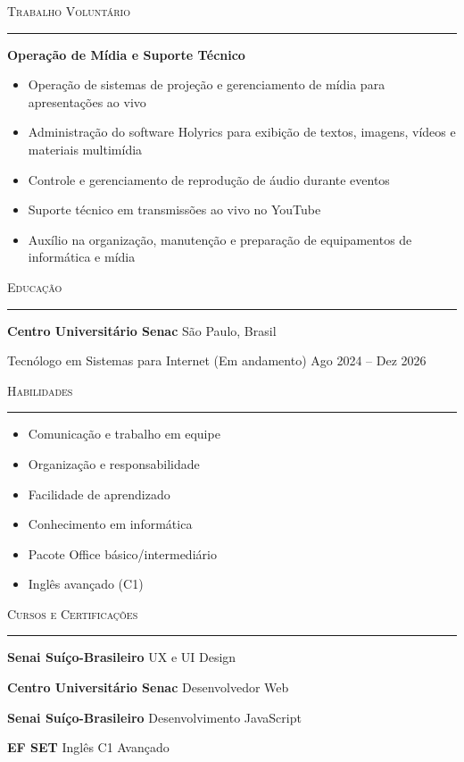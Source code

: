 \documentclass[a4paper]{article}
\newcommand{\header}[1]{
    \vspace{4mm}
    {\large\textsc{#1}}
    
    \vspace{1mm}
    \hrule
    
    \vspace{2mm}
}
\begin{document}

\header{Trabalho Voluntário}

\textbf{Operação de Mídia e Suporte Técnico}

\begin{itemize}[leftmargin=*, itemsep=1pt]
    \item Operação de sistemas de projeção e gerenciamento de mídia para apresentações ao vivo
    \item Administração do software Holyrics para exibição de textos, imagens, vídeos e materiais multimídia
    \item Controle e gerenciamento de reprodução de áudio durante eventos
    \item Suporte técnico em transmissões ao vivo no YouTube
    \item Auxílio na organização, manutenção e preparação de equipamentos de informática e mídia
\end{itemize}


\header{Educação}

\textbf{Centro Universitário Senac}
\hfill São Paulo, Brasil

Tecnólogo em Sistemas para Internet (Em andamento)
\hfill Ago 2024 -- Dez 2026


\header{Habilidades}

\begin{itemize}[leftmargin=*, itemsep=1pt]
    \item Comunicação e trabalho em equipe
    \item Organização e responsabilidade
    \item Facilidade de aprendizado
    \item Conhecimento em informática
    \item Pacote Office básico/intermediário
    \item Inglês avançado (C1)
\end{itemize}


\header{Cursos e Certificações}

\textbf{Senai Suíço-Brasileiro}
\hfill UX e UI Design

\textbf{Centro Universitário Senac}
\hfill Desenvolvedor Web

\textbf{Senai Suíço-Brasileiro}
\hfill Desenvolvimento JavaScript

\textbf{EF SET}
\hfill Inglês C1 Avançado
\end{document}
